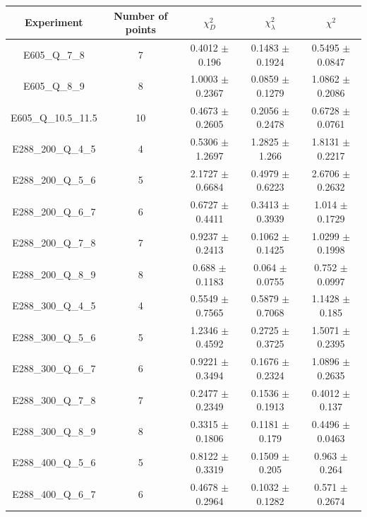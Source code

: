 \documentclass[
]{article}
\begin{document}
\begin{table}[h]

\centering

\begin{tabular}{|c|c|c|c|c|} \hline

\textbf{Experiment} & \textbf{Number of
points} & \textbf{\(\chi_{D}^2\)} & \textbf{\(\chi_{\lambda}^2\)} & \textbf{\(\chi^2\)} \\ \hline

E605\_Q\_7\_8 & 7 & 0.4012 \(\pm\) 0.196 & 0.1483 \(\pm\)
0.1924 & 0.5495 \(\pm\) 0.0847 \\ \hline
E605\_Q\_8\_9 & 8 & 1.0003 \(\pm\) 0.2367 & 0.0859 \(\pm\)
0.1279 & 1.0862 \(\pm\) 0.2086 \\ \hline
E605\_Q\_10.5\_11.5 & 10 & 0.4673 \(\pm\) 0.2605 & 0.2056 \(\pm\)
0.2478 & 0.6728 \(\pm\) 0.0761 \\ \hline
E288\_200\_Q\_4\_5 & 4 & 0.5306 \(\pm\) 1.2697 & 1.2825 \(\pm\)
1.266 & 1.8131 \(\pm\) 0.2217 \\ \hline
E288\_200\_Q\_5\_6 & 5 & 2.1727 \(\pm\) 0.6684 & 0.4979 \(\pm\)
0.6223 & 2.6706 \(\pm\) 0.2632 \\ \hline
E288\_200\_Q\_6\_7 & 6 & 0.6727 \(\pm\) 0.4411 & 0.3413 \(\pm\)
0.3939 & 1.014 \(\pm\) 0.1729 \\ \hline
E288\_200\_Q\_7\_8 & 7 & 0.9237 \(\pm\) 0.2413 & 0.1062 \(\pm\)
0.1425 & 1.0299 \(\pm\) 0.1998 \\ \hline
E288\_200\_Q\_8\_9 & 8 & 0.688 \(\pm\) 0.1183 & 0.064 \(\pm\)
0.0755 & 0.752 \(\pm\) 0.0997 \\ \hline
E288\_300\_Q\_4\_5 & 4 & 0.5549 \(\pm\) 0.7565 & 0.5879 \(\pm\)
0.7068 & 1.1428 \(\pm\) 0.185 \\ \hline
E288\_300\_Q\_5\_6 & 5 & 1.2346 \(\pm\) 0.4592 & 0.2725 \(\pm\)
0.3725 & 1.5071 \(\pm\) 0.2395 \\ \hline
E288\_300\_Q\_6\_7 & 6 & 0.9221 \(\pm\) 0.3494 & 0.1676 \(\pm\)
0.2324 & 1.0896 \(\pm\) 0.2635 \\ \hline
E288\_300\_Q\_7\_8 & 7 & 0.2477 \(\pm\) 0.2349 & 0.1536 \(\pm\)
0.1913 & 0.4012 \(\pm\) 0.137 \\ \hline
E288\_300\_Q\_8\_9 & 8 & 0.3315 \(\pm\) 0.1806 & 0.1181 \(\pm\)
0.179 & 0.4496 \(\pm\) 0.0463 \\ \hline
E288\_400\_Q\_5\_6 & 5 & 0.8122 \(\pm\) 0.3319 & 0.1509 \(\pm\)
0.205 & 0.963 \(\pm\) 0.264 \\ \hline
E288\_400\_Q\_6\_7 & 6 & 0.4678 \(\pm\) 0.2964 & 0.1032 \(\pm\)
0.1282 & 0.571 \(\pm\) 0.2674 \\ \hline

\end{tabular}
\end{table}
\end{document}
